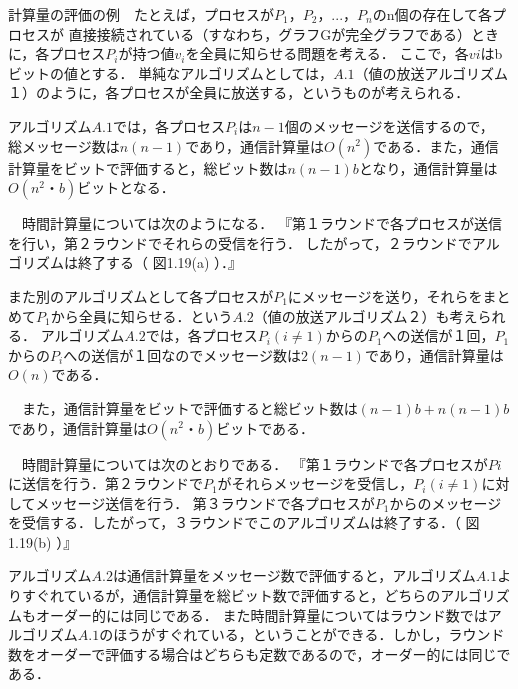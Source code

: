 \documentclass[a4paper,12pt]{jsarticle}
\begin{document}
計算量の評価の例　たとえば，プロセスが$P_1$，$P_2$，...，$P_n$のn個の存在して各プロセスが
直接接続されている（すなわち，グラフGが完全グラフである）ときに，各プロセス$P_i$が持つ値$v_i$を全員に知らせる問題を考える．
ここで，各$vi$はbビットの値とする．
単純なアルゴリズムとしては，$A.1$（値の放送アルゴリズム１）のように，各プロセスが全員に放送する，というものが考えられる．

アルゴリズム$A.1$では，各プロセス$P_i$は$n-1$個のメッセージを送信するので，
総メッセージ数は$n(n - 1)$であり，通信計算量は$O(n^2)$である．また，通信計算量をビットで評価すると，総ビット数は$n(n-1)b$となり，通信計算量は$O(n^2・b)$ビットとなる．

　時間計算量については次のようになる．
『第１ラウンドで各プロセスが送信を行い，第２ラウンドでそれらの受信を行う．
したがって，２ラウンドでアルゴリズムは終了する（ 図1.19(a) ）．』

また別のアルゴリズムとして各プロセスが$P_1$にメッセージを送り，それらをまとめて$P_1$から全員に知らせる．という$A.2$（値の放送アルゴリズム２）も考えられる．
アルゴリズム$A.2$では，各プロセス$P_i(i≠1)$からの$P_1$への送信が１回，$P_1$からの$P_i$への送信が１回なのでメッセージ数は$2(n-1)$であり，通信計算量は$O(n)$である．

　また，通信計算量をビットで評価すると総ビット数は$(n-1)b+n(n-1)b$であり，通信計算量は$O(n^2・b)$ビットである．

　時間計算量については次のとおりである．
『第１ラウンドで各プロセスが$Pi$に送信を行う．第２ラウンドで$P_1$がそれらメッセージを受信し，$P_i(i≠1)$に対してメッセージ送信を行う．
第３ラウンドで各プロセスが$P_1$からのメッセージを受信する．したがって，３ラウンドでこのアルゴリズムは終了する．（ 図1.19(b) ）』

アルゴリズム$A.2$は通信計算量をメッセージ数で評価すると，アルゴリズム$A.1$よりすぐれているが，通信計算量を総ビット数で評価すると，どちらのアルゴリズムもオーダー的には同じである．
また時間計算量についてはラウンド数ではアルゴリズム$A.1$のほうがすぐれている，ということができる．しかし，ラウンド数をオーダーで評価する場合はどちらも定数であるので，オーダー的には同じである．



\end{document}
